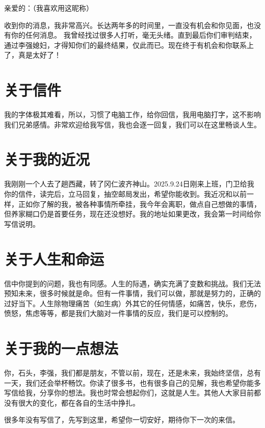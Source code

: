 
亲爱的\receivernickname：（我喜欢用这昵称）

\vspace{\baselineskip}

收到你的消息，我非常高兴。长达两年多的时间里，一直没有机会和你见面，也没有你的任何消息。 我曾经找过很多人打听，毫无头绪。直到最后你们审判结束，通过李强媳妇，才得知你们的最终结果，仅此而已。现在终于有机会和你联系上了，真是太好了！

\section*{关于信件}
我的字体极其难看，所以，习惯了电脑工作，给你回信，我用电脑打字，这不影响我们兄弟感情。非常欢迎给我写信，我也会逐一回复，我们可以在这里畅谈人生。

\section*{关于我的近况}
我刚刚一个人去了趟西藏，转了冈仁波齐神山。2025.9.24日刚来上班，门卫给我你的信件，读完后，立马回复，抽空邮局发出，希望你能收到。我近况和以前一样，正如你了解的我，被各种事情所牵挂，我今年会离职，做点自己想做的事情，但养家糊口仍是首要任务，现在还没想好。我的地址如果更改，我会第一时间给你写信说明。

\section*{关于人生和命运}
信中你提到的问题，我也有同感。人生的际遇，确实充满了变数和挑战。我们无法预知未来，很多时候就是命。但有一件事情，我们可以做，那就是努力的，正确的过好当下。人生除物理痛苦（如生病）外其它的任何情感，如痛苦，快乐，悲伤，愤怒，焦虑等等，都是我们大脑对一件事情的反应，我们是可以控制的。

\section*{关于我的一点想法}
你，石头，李强，我们都是朋友，不管以前，现在，还是未来，我始终坚信，总有一天，我们还会举杯畅饮。你读了很多书，也有很多自己的见解，我也希望你能多写信给我，分享你的想法。我也时常会想起你们，这就是人生。其他人大家目前都没有很大的变化，都在各自的生活中挣扎。

很多年没有写信了，先写到这里，希望你一切安好，期待你下一次的来信。
